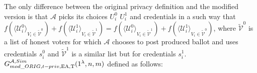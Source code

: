 \begin{definition}

The only difference between the original privacy definition and the modified version is that $\mathcal{A}$ picks its choices $U^0_i$ $U^1_i$ and credentials in a such way that $f(\langle \mathcal{U}^0_i \rangle _{V_i \in \tilde{\mathcal{V}}^0} ) + f(\langle \mathcal{U}^1_i \rangle _{V_i \in \tilde{\mathcal{V}}^1} ) =  f(\langle \mathcal{U}^0_i \rangle _{V_i \in \tilde{\mathcal{V}}^1} ) +  f(\langle \mathcal{U}^1_i \rangle _{V_i \in \tilde{\mathcal{V}}^0} )$, where $ \tilde{\mathcal{V}}^0$ is a list of honest voters for which $\mathcal{A}$ chooses to post produced ballot and uses credentials $s_i^0$ and  $ \tilde{\mathcal{V}}^1$ is a similar list but for credentials $s_i^1$. \\ 

$G_{mod\_ORIG,t-priv,\operatorname{EA},\operatorname{T}}^{\mathcal{A}, Sim}(1^{\lambda},n,m)$ defined as follows:\\


\end{definition}
